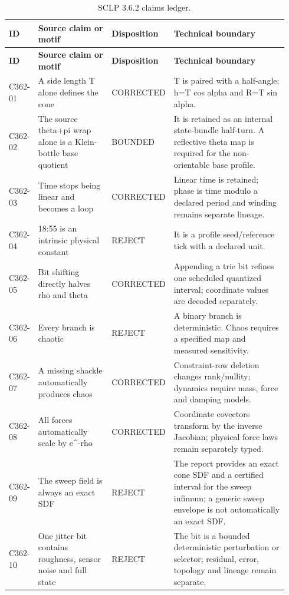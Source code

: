 \small
\setlength{\tabcolsep}{3.5pt}
\renewcommand{\arraystretch}{1.16}
\begin{longtable}{p{0.08\linewidth} p{0.28\linewidth} p{0.11\linewidth} p{0.47\linewidth}}
\caption{SCLP 3.6.2 claims ledger.}\label{tab:sclp-claims}\\
\toprule
\textbf{ID} & \textbf{Source claim or motif} & \textbf{Disposition} & \textbf{Technical boundary}\\
\midrule
\endfirsthead
\toprule
\textbf{ID} & \textbf{Source claim or motif} & \textbf{Disposition} & \textbf{Technical boundary}\\
\midrule
\endhead
C362-01 & A side length T alone defines the cone & CORRECTED & T is paired with a half-angle; h=T cos alpha and R=T sin alpha.\\
C362-02 & The source theta+pi wrap alone is a Klein-bottle base quotient & BOUNDED & It is retained as an internal state-bundle half-turn. A reflective theta map is required for the non-orientable base profile.\\
C362-03 & Time stops being linear and becomes a loop & CORRECTED & Linear time is retained; phase is time modulo a declared period and winding remains separate lineage.\\
C362-04 & 18:55 is an intrinsic physical constant & REJECT & It is a profile seed/reference tick with a declared unit.\\
C362-05 & Bit shifting directly halves rho and theta & CORRECTED & Appending a trie bit refines one scheduled quantized interval; coordinate values are decoded separately.\\
C362-06 & Every branch is chaotic & REJECT & A binary branch is deterministic. Chaos requires a specified map and measured sensitivity.\\
C362-07 & A missing shackle automatically produces chaos & CORRECTED & Constraint-row deletion changes rank/nullity; dynamics require mass, force and damping models.\\
C362-08 & All forces automatically scale by e\textasciicircum{}-rho & CORRECTED & Coordinate covectors transform by the inverse Jacobian; physical force laws remain separately typed.\\
C362-09 & The sweep field is always an exact SDF & REJECT & The report provides an exact cone SDF and a certified interval for the sweep infimum; a generic sweep envelope is not automatically an exact SDF.\\
C362-10 & One jitter bit contains roughness, sensor noise and full state & REJECT & The bit is a bounded deterministic perturbation or selector; residual, error, topology and lineage remain separate.\\

\end{longtable}
